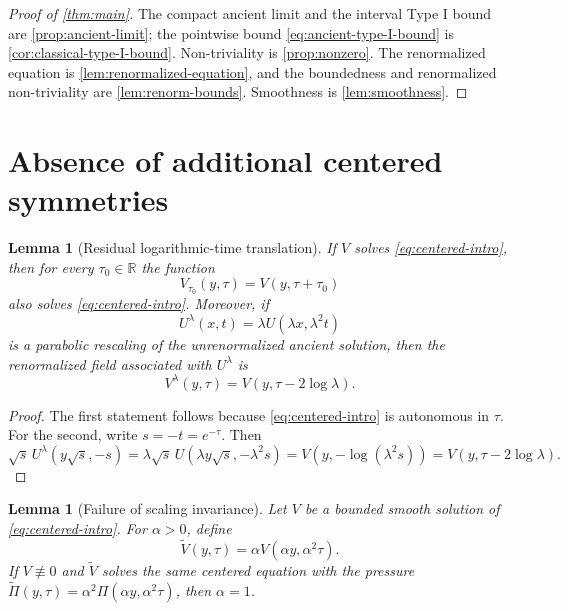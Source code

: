 \documentclass[11pt]{amsart}
\theoremstyle{plain}
\newtheorem{lemma}[theorem]{Lemma}
\theoremstyle{definition}
\theoremstyle{remark}
\numberwithin{equation}{section}
\newcommand{\R}{\mathbb R}
\begin{document}
\begin{proof}[Proof of \cref{thm:main}]
The compact ancient limit and the interval Type I bound are
\cref{prop:ancient-limit}; the pointwise bound
\eqref{eq:ancient-type-I-bound} is \cref{cor:classical-type-I-bound}.
Non-triviality is \cref{prop:nonzero}.  The renormalized equation is
\cref{lem:renormalized-equation}, and the boundedness and renormalized
non-triviality are \cref{lem:renorm-bounds}.  Smoothness is
\cref{lem:smoothness}.
\end{proof}

\section{Absence of additional centered symmetries}\label{sec:symmetry}

\begin{lemma}[Residual logarithmic-time translation]\label{lem:tau-translation}
If \(V\) solves \eqref{eq:centered-intro}, then for every \(\tau_0\in\R\)
the function
\[
   V_{\tau_0}(y,\tau)=V(y,\tau+\tau_0)
\]
also solves \eqref{eq:centered-intro}.  Moreover, if
\[
   U^\lambda(x,t)=\lambda U(\lambda x,\lambda^2t)
\]
is a parabolic rescaling of the unrenormalized ancient solution, then the
renormalized field associated with \(U^\lambda\) is
\[
   V^\lambda(y,\tau)=V(y,\tau-2\log\lambda).
\]
\end{lemma}

\begin{proof}
The first statement follows because \eqref{eq:centered-intro} is autonomous in
\(\tau\).  For the second, write \(s=-t=e^{-\tau}\).  Then
\[
   \sqrt{s}\,U^\lambda(y\sqrt{s},-s)
   =
   \lambda\sqrt{s}\,U(\lambda y\sqrt{s},-\lambda^2s)
   =
   V(y,-\log(\lambda^2s))
   =
   V(y,\tau-2\log\lambda).
\]
\end{proof}

\begin{lemma}[Failure of scaling invariance]\label{lem:no-scaling}
Let \(V\) be a bounded smooth solution of \eqref{eq:centered-intro}.  For
\(\alpha>0\), define
\[
   \widetilde V(y,\tau)=\alpha V(\alpha y,\alpha^2\tau).
\]
If \(V\not\equiv0\) and \(\widetilde V\) solves the same centered equation
with the pressure
\(\widetilde\Pi(y,\tau)=\alpha^2\Pi(\alpha y,\alpha^2\tau)\), then
\(\alpha=1\).
\end{lemma}
\end{document}
